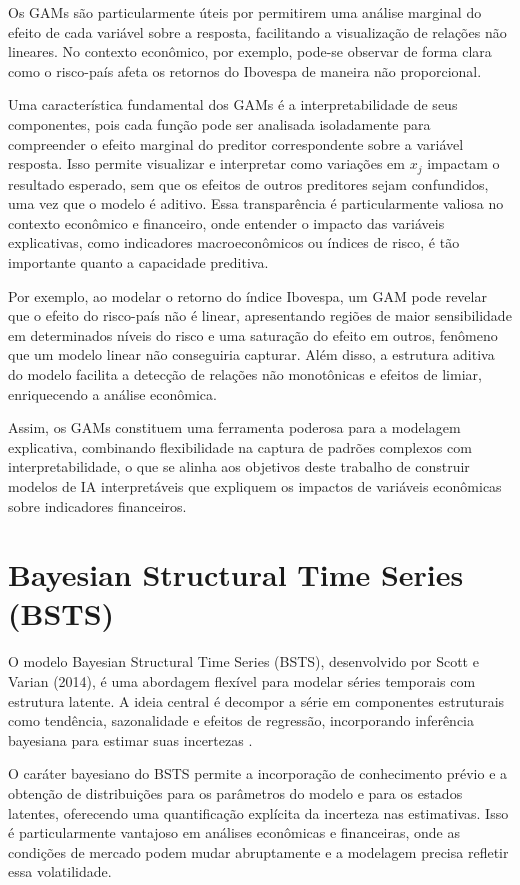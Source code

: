 \documentclass[	12pt, Times, openright, oneside, a4paper, english, brazil]{abntex2}
\begin{document}
Os GAMs são particularmente úteis por permitirem uma análise marginal do efeito de cada variável sobre a resposta, facilitando a visualização de relações não lineares. No contexto econômico, por exemplo, pode-se observar de forma clara como o risco-país afeta os retornos do Ibovespa de maneira não proporcional.

Uma característica fundamental dos GAMs é a interpretabilidade de seus componentes, pois cada função pode ser analisada isoladamente para compreender o efeito marginal do preditor correspondente sobre a variável resposta. Isso permite visualizar e interpretar como variações em $x_j$ impactam o resultado esperado, sem que os efeitos de outros preditores sejam confundidos, uma vez que o modelo é aditivo. Essa transparência é particularmente valiosa no contexto econômico e financeiro, onde entender o impacto das variáveis explicativas, como indicadores macroeconômicos ou índices de risco, é tão importante quanto a capacidade preditiva.

Por exemplo, ao modelar o retorno do índice Ibovespa, um GAM pode revelar que o efeito do risco-país não é linear, apresentando regiões de maior sensibilidade em determinados níveis do risco e uma saturação do efeito em outros, fenômeno que um modelo linear não conseguiria capturar. Além disso, a estrutura aditiva do modelo facilita a detecção de relações não monotônicas e efeitos de limiar, enriquecendo a análise econômica.

Assim, os GAMs constituem uma ferramenta poderosa para a modelagem explicativa, combinando flexibilidade na captura de padrões complexos com interpretabilidade, o que se alinha aos objetivos deste trabalho de construir modelos de IA interpretáveis que expliquem os impactos de variáveis econômicas sobre indicadores financeiros.

\section{Bayesian Structural Time Series (BSTS)}

O modelo Bayesian Structural Time Series (BSTS), desenvolvido por Scott e Varian (2014), é uma abordagem flexível para modelar séries temporais com estrutura latente. A ideia central é decompor a série em componentes estruturais como tendência, sazonalidade e efeitos de regressão, incorporando inferência bayesiana para estimar suas incertezas \cite{Scott2014Predicting}.

O caráter bayesiano do BSTS permite a incorporação de conhecimento prévio e a obtenção de distribuições para os parâmetros do modelo e para os estados latentes, oferecendo uma quantificação explícita da incerteza nas estimativas. Isso é particularmente vantajoso em análises econômicas e financeiras, onde as condições de mercado podem mudar abruptamente e a modelagem precisa refletir essa volatilidade.
\end{document}
